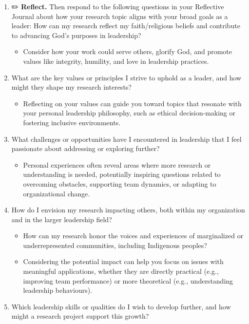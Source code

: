 \documentclass[
  letterpaper,
  DIV=11,
  numbers=noendperiod]{scrreprt}
\providecommand{\tightlist}{%
  \setlength{\itemsep}{0pt}\setlength{\parskip}{0pt}}\usepackage{longtable,booktabs,array}
\begin{document}
\begin{enumerate}
\def\labelenumi{\arabic{enumi}.}
\tightlist
\item
  ✏️ \textbf{Reflect.} Then respond to the following questions in your
  Reflective Journal about how your research topic aligns with your
  broad goals as a leader: How can my research reflect my
  faith/religious beliefs and contribute to advancing God's purposes in
  leadership?

  \begin{itemize}
  \tightlist
  \item
    Consider how your work could serve others, glorify God, and promote
    values like integrity, humility, and love in leadership practices.
  \end{itemize}
\item
  What are the key values or principles I strive to uphold as a leader,
  and how might they shape my research interests?

  \begin{itemize}
  \tightlist
  \item
    Reflecting on your values can guide you toward topics that resonate
    with your personal leadership philosophy, such as ethical
    decision-making or fostering inclusive environments.
  \end{itemize}
\item
  What challenges or opportunities have I encountered in leadership that
  I feel passionate about addressing or exploring further?

  \begin{itemize}
  \tightlist
  \item
    Personal experiences often reveal areas where more research or
    understanding is needed, potentially inspiring questions related to
    overcoming obstacles, supporting team dynamics, or adapting to
    organizational change.
  \end{itemize}
\item
  How do I envision my research impacting others, both within my
  organization and in the larger leadership field?

  \begin{itemize}
  \tightlist
  \item
    How can my research honor the voices and experiences of marginalized
    or underrepresented communities, including Indigenous peoples?
  \item
    Considering the potential impact can help you focus on issues with
    meaningful applications, whether they are directly practical (e.g.,
    improving team performance) or more theoretical (e.g., understanding
    leadership behaviours).
  \end{itemize}
\item
  Which leadership skills or qualities do I wish to develop further, and
  how might a research project support this growth?


\end{enumerate}
\end{document}
